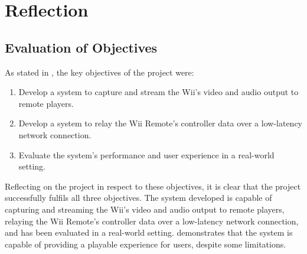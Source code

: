 \section{Reflection}

\subsection{Evaluation of Objectives}
As stated in , the key objectives of the project were:

\begin{enumerate}
	\item  Develop a system to capture and stream the Wii’s video and audio output to remote players.
	\item Develop a system to relay the Wii Remote’s controller data over a low-latency network connection.
	\item Evaluate the system’s performance and user experience in a real-world setting.
\end{enumerate}

Reflecting on the project in respect to these objectives, it is clear that the
project successfully fulfils all three objectives. The system developed is
capable of capturing and streaming the Wii’s video and audio output to remote
players, relaying the Wii Remote’s controller data over a low-latency network
connection, and has been evaluated in a real-world setting.  demonstrates that the system is capable of
providing a playable experience for users, despite some limitations.



